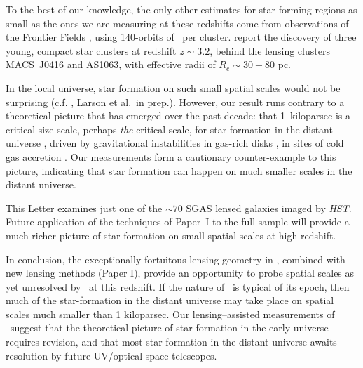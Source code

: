To the best of our knowledge, the only other estimates for star
forming regions as small as the ones we are measuring at these
redshifts come from observations of the Frontier Fields \citep{Lotz:2017gd}, 
using 140-orbits of \hst\ per cluster.
\citet{Vanzella:2017wd,Vanzella:2017ea} report the discovery of three young, compact star clusters
at redshift $z\sim3.2$, behind the lensing clusters MACS~J0416 and AS1063, 
with effective radii of $R_e \sim30-80$ pc.

In the local universe, star formation on such small spatial scales
would not be surprising (c.f. \citealt{Liu:2013qy},  Larson et al.\ in prep.). 
However, our result runs contrary to a theoretical picture that has emerged over the past decade: 
that 1~kiloparsec is a critical size scale, perhaps {\it the} critical scale, for 
star formation in the distant universe 
\citep{Elmegreen:2005xy, Elmegreen:2007qv, Elmegreen:2009nr, Forster-Schreiber:2011sf, 
Guo:2011rm, Guo:2015zl}, driven by gravitational instabilities in gas-rich disks 
\citep{Toomre:1964fr, Noguchi:1999vf, Genzel:2011ys},
in sites of cold gas accretion \citep{Keres:2005yq, Dekel:2006qf, Brooks:2009jk}.
Our measurements form a cautionary counter-example to this picture,
indicating that star formation can happen on much smaller scales in the distant universe.

This Letter examines just one of the $\sim70$ SGAS lensed galaxies 
imaged by \textit{HST}.  Future application of the techniques of Paper~I to the full sample 
will provide a much richer picture of star formation on small spatial scales at high redshift.

In conclusion, the exceptionally fortuitous lensing geometry in \arcname,
combined with new lensing methods (Paper I), 
provide an opportunity to probe spatial scales as yet
unresolved by \hst\ at this redshift.
If the nature of \arcname\ is typical of its epoch,
then much of the star-formation in the distant universe may 
take place on spatial scales much smaller than 1 kiloparsec. 
Our lensing--assisted measurements of \arcname\ 
suggest that the theoretical picture of star formation in the early universe 
requires revision,  and that most star formation in the distant universe awaits 
resolution by  future UV/optical space telescopes.
 


